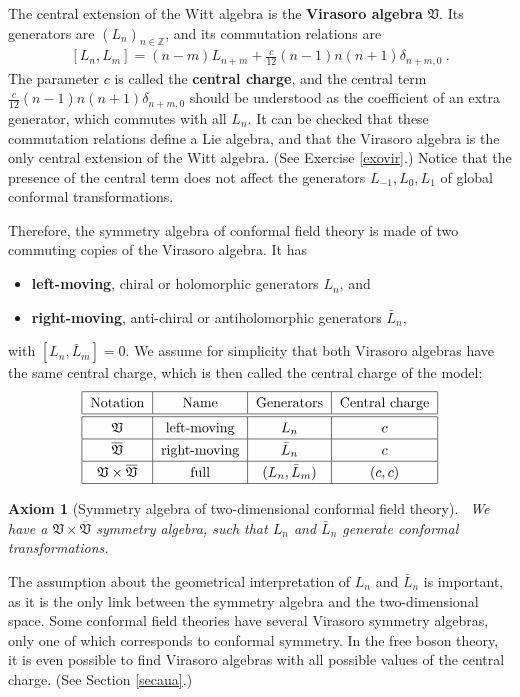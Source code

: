 \documentclass[12pt, a4paper, notitlepage, twoside]{report}
\numberwithin{equation}{section}
\theoremstyle{break}
\newtheorem{hyp}{Axiom}[chapter]
\begin{document}
The central extension of the Witt algebra is the 
\textbf{\boldmath Virasoro algebra} $\mathfrak{V}$.
Its generators are $(L_n)_{n\in {\mathbb{Z}}}$, and its commutation relations are 
\begin{align}
 \boxed{[L_n,L_m]=(n-m)L_{n+m} + \frac{c}{12} (n-1)n(n+1) \delta_{n+m,0}}\ .
\label{vir}
\end{align}
The parameter $c$ is called the \textbf{\boldmath central charge}, and the central term $\frac{c}{12} (n-1)n(n+1) \delta_{n+m,0}$ should be understood as the coefficient of an extra generator, which commutes with all $L_n$.
It can be checked that these commutation relations define a Lie algebra, and that the Virasoro algebra is the only central extension of the Witt algebra. (See Exercise \ref{exovir}.) Notice that the presence of the central term does not affect the generators $L_{-1},L_0,L_1$ of global conformal transformations. 

Therefore, the symmetry algebra of conformal field theory is made of two commuting copies of the Virasoro algebra. It has
\begin{itemize}
 \item \textbf{\boldmath left-moving}, chiral or holomorphic
generators $L_n$,  and
\item  \textbf{\boldmath right-moving}, anti-chiral or antiholomorphic generators $\bar{L}_n$,
\end{itemize}
 with
$[L_n,\bar{L}_m]=0$.
We assume for simplicity that both Virasoro algebras have the same central charge, which is then called the central charge of the model:
\begin{align}
\renewcommand{\arraystretch}{1.3}
 \begin{tabular}{|c|c|c|c|}
 \hline
Notation &  Name & Generators &  Central\ charge
\\
\hline\hline
 $\mathfrak{V}$ & left-moving & $L_n$ & $c$
\\
\hline
$\overline{\mathfrak{V}}$ & right-moving & $\bar{L}_n$ & $c$
\\
\hline
$\mathfrak{V}\times \overline{\mathfrak{V}}$ & full & $(L_n,\bar{L}_m)$ & $(c,c)$
\\  
\hline
 \end{tabular}
\end{align}

\begin{hyp}[Symmetry algebra of two-dimensional conformal field theory]
 ~\label{ax:sa}
 We have a $\mathfrak{V}\times \overline{\mathfrak{V}}$ symmetry algebra, such that $L_n$ and $\bar{L}_n$ generate conformal transformations. 
\end{hyp} 
\noindent
The assumption about the geometrical interpretation of $L_n$ and $\bar{L}_n$ is important, as it is the only link between the symmetry algebra and the two-dimensional space.
Some conformal field theories have several Virasoro symmetry algebras, only one of which corresponds to conformal symmetry.
In the free boson theory, it is even possible to find Virasoro algebras with all possible values of the central charge. (See Section \ref{secaua}.)
\end{document}
